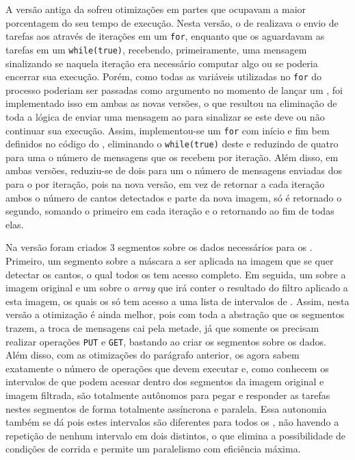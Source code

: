 A versão antiga da \textit{\FAST} sofreu otimizações em partes que ocupavam a maior porcentagem do seu tempo de execução. Nesta versão, o \cluster de \IO realizava o envio de tarefas aos \CCs através de iterações em um \texttt{for}, enquanto que os \CCs aguardavam as tarefas em um \texttt{while(true)}, recebendo, primeiramente, uma mensagem sinalizando se naquela iteração era necessário computar algo ou se poderia encerrar sua execução. Porém, como todas as variáveis utilizadas no \texttt{for} do processo \master poderiam ser passadas como argumento no momento de lançar um \CC, foi implementado isso em ambas as novas versões, o que resultou na eliminação de toda a lógica de enviar uma mensagem ao \slave para sinalizar se este deve ou não continuar sua execução. Assim, implementou-se um \texttt{for} com início e fim bem definidos no código do \slave, eliminando o \texttt{while(true)} deste e reduzindo de quatro para uma o número de mensagens que os \slaves recebem por iteração. Além disso, em ambas versões, reduziu-se de dois para um o número de mensagens enviadas dos \slaves para o \master por iteração, pois na nova versão, em vez de retornar a cada iteração ambos o número de cantos detectados e parte da nova imagem, só é retornado o segundo, somando o primeiro em cada iteração e o retornando ao fim de todas elas.

Na versão \ASYNC foram criados 3 segmentos sobre os dados necessários para os \slaves. Primeiro, um segmento sobre a máscara a ser aplicada na imagem que se quer detectar os cantos, o qual todos os \CCs tem acesso completo. Em seguida, um sobre a imagem original e um sobre o \textit{array} que irá conter o resultado do filtro aplicado a esta imagem, os quais os \CCs só tem acesso a uma lista de intervalos de \offsets. Assim, nesta versão a otimização é ainda melhor, pois com toda a abstração que os segmentos trazem, a troca de mensagens cai pela metade, já que somente os \slaves precisam realizar operações \texttt{PUT} e \texttt{GET}, bastando ao \master criar os segmentos sobre os dados. Além disso, com as otimizações do parágrafo anterior, os \slaves agora sabem exatamente o número de operações que devem executar e, como conhecem os intervalos de \offsets que podem acessar dentro dos segmentos da imagem original e imagem filtrada, são totalmente autônomos para pegar e responder as tarefas nestes segmentos de forma totalmente assíncrona e paralela. Essa autonomia também se dá pois estes intervalos são diferentes para todos os \slaves, não havendo a repetição de nenhum intervalo em dois \CCs distintos, o que elimina a possibilidade de condições de corrida e permite um paralelismo com eficiência máxima.

